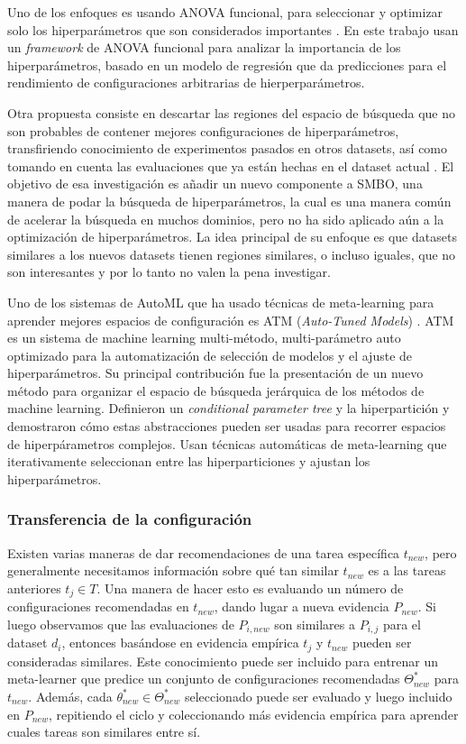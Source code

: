 Uno de los enfoques es usando ANOVA funcional, para seleccionar y optimizar solo los hiperparámetros que son considerados importantes \cite{rijn2018hyp}. En este trabajo usan un \textit{framework} de ANOVA funcional para analizar la importancia de los hiperparámetros, basado en un modelo de regresión que da predicciones para el rendimiento de configuraciones arbitrarias de hierperparámetros.

Otra propuesta consiste en descartar las regiones del espacio de búsqueda que no son probables de contener mejores configuraciones de hiperparámetros, transfiriendo conocimiento de experimentos pasados en otros datasets, así como tomando en cuenta las evaluaciones que ya están hechas en el dataset actual \cite{witsuba2015hyper}. El objetivo de esa investigación es añadir un nuevo componente a SMBO, una manera de podar la búsqueda de hiperparámetros, la cual es una manera común de acelerar la búsqueda en muchos dominios, pero no ha sido aplicado aún a la optimización de hiperparámetros. La idea principal de su enfoque es que datasets similares a los nuevos datasets tienen regiones similares, o incluso iguales, que no son interesantes y por lo tanto no valen la pena investigar.

Uno de los sistemas de AutoML que ha usado técnicas de meta-learning para aprender mejores espacios de configuración es ATM (\textit{Auto-Tuned Models}) \cite{mendoza2016towards}. ATM es un sistema de machine learning multi-método, multi-parámetro auto optimizado para la automatización de selección de modelos y el ajuste de hiperparámetros. Su principal contribución fue la presentación de un nuevo método para organizar el espacio de búsqueda jerárquica de los métodos de machine learning. Definieron un \textit{conditional parameter tree} y la hiperpartición y demostraron cómo estas abstracciones pueden ser usadas para recorrer espacios de hiperpárametros complejos. Usan técnicas automáticas de meta-learning que iterativamente seleccionan entre las hiperparticiones y ajustan los hiperparámetros.

\subsubsection{Transferencia de la configuración}


Existen varias maneras de dar recomendaciones de una tarea específica $t_{new}$, pero generalmente necesitamos información sobre qué tan similar $t_{new}$ es a las tareas anteriores $t_j \in T$. Una manera de hacer esto es evaluando un número de configuraciones recomendadas en $t_{new}$, dando lugar a nueva evidencia $P_{new}$. Si luego observamos que las evaluaciones de $P_{i,new}$ son similares a $P_{i,j}$ para el dataset $d_i$, entonces basándose en evidencia empírica $t_j$ y $t_{new}$ pueden ser consideradas similares. Este conocimiento puede ser incluido para entrenar un meta-learner que predice un conjunto de configuraciones recomendadas $\Theta_{new}^*$ para $t_{new}$. Además, cada $\theta^*_{new} \in \Theta_{new}^*$ seleccionado puede ser evaluado y luego incluido en $P_{new}$, repitiendo el ciclo y coleccionando más evidencia empírica para aprender cuales tareas son similares entre sí.

